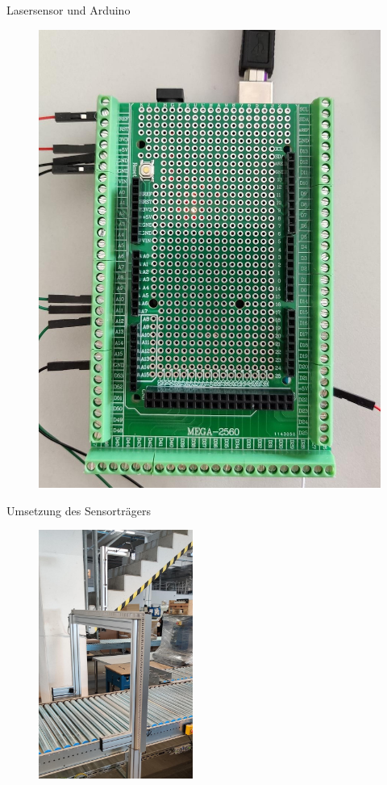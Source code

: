 \documentclass[10pt,ngerman]{beamer}
\begin{document}
\begin{frame}[fragile]{Lasersensor und Arduino}
\begin{minipage}[t]{0.49\textwidth}
\begin{figure}
      \includegraphics[width=1\textwidth]{pics/Arduino.jpeg}
    \end{figure}
  \end{minipage}
\end{frame}


\begin{frame}[fragile]{Umsetzung des Sensorträgers}
  \begin{figure}[htpb]
    \centering
    \includegraphics[width=0.45\textwidth]{pics/Sensortraeger_cropped.jpeg}
  \end{figure}
\end{frame}
\end{document}
